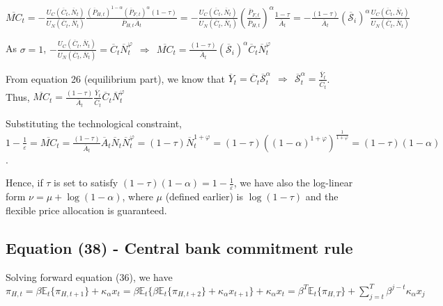 \documentclass[
]{article}
\begin{document}
\(\displaystyle \overline{MC}_t= -\frac{U_C(\overline{C}_t,\overline{N}_t)}{U_N(\overline{C}_t,\overline{N}_t)}\frac{(\overline{P}_{H,t})^{1-\alpha}(\overline{P}_{F,t})^\alpha (1-\tau)}{\overline{P}_{H,t} \overline{A}_t}= -\frac{U_C(\overline{C}_t,\overline{N}_t)}{U_N(\overline{C}_t,\overline{N}_t)} \left( \frac{\overline{P}_{F,t}}{\overline{P}_{H,t}} \right)^\alpha \frac{1-\tau}{\overline{A}_t}= -\frac{(1-\tau)}{\overline{A}_t} (\mathcal{\overline{S}}_i)^\alpha \frac{U_C(\overline{C}_t,\overline{N}_t)}{U_N(\overline{C}_t,\overline{N}_t)}\)

As \(\sigma=1\),
\(\displaystyle -\frac{U_C(\overline{C}_t,\overline{N}_t)}{U_N(\overline{C}_t,\overline{N}_t)}=\overline{C}_t \overline{N}_t^\varphi \ \ \Rightarrow \ \ \overline{MC}_t= \frac{(1-\tau)}{\overline{A}_t} (\mathcal{\overline{S}}_i)^\alpha \overline{C}_t \overline{N}_t^\varphi\)

From equation 26 (equilibrium part), we know that
\(\displaystyle \overline{Y}_t=\overline{C}_t \mathcal{\overline{S}}_t^\alpha \ \ \Rightarrow \ \  \mathcal{\overline{S}}_t^\alpha = \frac{\overline{Y}_t}{\overline{C}_t}\).
Thus,
\(\displaystyle \overline{MC}_t= \frac{(1-\tau)}{\overline{A}_t} \frac{\overline{Y}_t}{\overline{C}_t} \overline{C}_t \overline{N}_t^\varphi\)

Substituting the technological constraint,
\(\displaystyle 1-\frac{1}{\varepsilon}=\overline{MC}_t= \frac{(1-\tau)}{\overline{A}_t} \overline{A}_t \overline{N}_t \overline{N}_t^\varphi=(1-\tau) \overline{N}_t^{1+\varphi}=(1-\tau)\left( (1-\alpha)^{1+\varphi} \right)^{\frac{1}{1+\varphi}}=(1-\tau)(1-\alpha)\).

Hence, if \(\tau\) is set to satisfy
\(\displaystyle (1-\tau)(1-\alpha)= 1-\frac{1}{\varepsilon}\), we have
also the log-linear form \(\nu=\mu+\log(1-\alpha)\), where \(\mu\)
(defined earlier) is \(\log(1-\tau)\) and the flexible price allocation
is guaranteed.

\hypertarget{equation-38---central-bank-commitment-rule}{%
\subsection{Equation (38) - Central bank commitment
rule}\label{equation-38---central-bank-commitment-rule}}

Solving forward equation (36), we have
\(\displaystyle \pi_{H,t}=\beta \mathbb{E}_t\{ \pi_{H,t+1} \}+ \kappa_\alpha x_t = \beta \mathbb{E}_t\{ \beta \mathbb{E}_t \{ \pi_{H,t+2} \}+ \kappa_\alpha x_{t+1}\}+ \kappa_\alpha x_t=\beta^T \mathbb{E}_t\{\pi_{H,T}\} + \sum_{j=t}^T \beta^{j-t}\kappa_\alpha x_j\)
\end{document}

